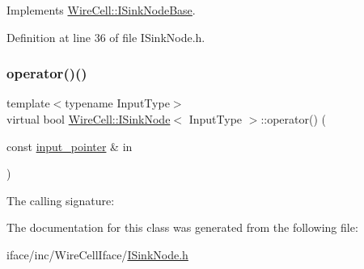 Implements \hyperlink{class_wire_cell_1_1_i_sink_node_base_a449038481c2f511bcfa7c7bf77641069}{Wire\+Cell\+::\+I\+Sink\+Node\+Base}.



Definition at line 36 of file I\+Sink\+Node.\+h.

\mbox{\label{class_wire_cell_1_1_i_sink_node_a80c826fd6b3f184ed26984b46c7fcb20}} 
\subsubsection{\texorpdfstring{operator()()}{operator()()}\hspace{0.1cm}{\footnotesize\ttfamily [2/2]}}
{\footnotesize\ttfamily template$<$typename Input\+Type$>$ \\
virtual bool \hyperlink{class_wire_cell_1_1_i_sink_node}{Wire\+Cell\+::\+I\+Sink\+Node}$<$ Input\+Type $>$\+::operator() (\begin{DoxyParamCaption}\item[{const \hyperlink{class_wire_cell_1_1_i_sink_node_abec1b6fe3da78c63bbc88c4f3f805d91}{input\+\_\+pointer} \&}]{in }\end{DoxyParamCaption})\hspace{0.3cm}{\ttfamily [pure virtual]}}



The calling signature\+: 



The documentation for this class was generated from the following file\+:\begin{DoxyCompactItemize}
\item 
iface/inc/\+Wire\+Cell\+Iface/\hyperlink{_i_sink_node_8h}{I\+Sink\+Node.\+h}\end{DoxyCompactItemize}
